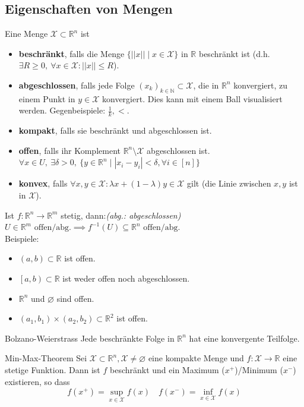 \documentclass[a4paper,10pt]{article}
\def\R{\mathbb{R}}
\def\N{\mathbb{N}}
\def\X{\mathcal{X}}
\begin{document}
\subsection{Eigenschaften von Mengen}
Eine Menge $\X \subset \R^n $ ist
\begin{itemize}
	\item \textbf{beschränkt}, falls die Menge $\{ ||x|| \mid x \in \X \}$ in $\R$ beschränkt ist (d.h. $\exists R \ge 0,\ \forall x \in \X: ||x|| \le R$).
	\item \textbf{abgeschlossen}, falls jede Folge $(x_k)_{k\in \N} \subset \X$, die in $\R^n$ konvergiert, zu einem Punkt in $y \in \X$ konvergiert. Dies kann mit einem Ball visualisiert werden. Gegenbeispiele: $\frac{1}{k}, <$.
	\item \textbf{kompakt}, falls sie beschränkt und abgeschlossen ist.
	\item \textbf{offen}, falls ihr Komplement $\R^n \setminus \X$ abgeschlossen ist. $\forall x \in U,\ \exists \delta>0,\ \{  y \in \mathbb{R}^{n} \mid |x_{i}-y_{i}| <\delta,\forall i\in [n] \}$
	\item \textbf{konvex}, falls $\forall x, y \in \X: \lambda x + (1 - \lambda)y \in \X$ gilt (die Linie zwischen $x, y$ ist in $\X$).
\end{itemize}
Ist $f: \mathbb{R}^{n}\to \mathbb{R}^{m}$ stetig, dann:\qquad  \textit{(abg.: abgeschlossen)}\\
$U \in \mathbb{R}^{m} \text{ offen/abg.}\implies f^{-1}(U) \subseteq \mathbb{R}^{n} \text{ offen/abg.}$ \\
Beispiele:
\begin{itemize}
	\item $(a,b) \subset \R$ ist offen.
	\item $\left[a,b\right) \subset \R$ ist weder offen noch abgeschlossen.
	\item $\R^n$ und $\varnothing$ sind offen.
	\item $(a_1, b_1) \times (a_2,b_2) \subset \R^2$ ist offen.
\end{itemize}
\begin{subbox}{Bolzano-Weierstrass}
    Jede beschränkte Folge in $\R^n$ hat eine konvergente Teilfolge.
\end{subbox}
\begin{subbox}{Min-Max-Theorem}
    Sei $\X \subset \R^n, \X \ne \varnothing$ eine kompakte Menge und $f: \X \to \R$ eine stetige Funktion. Dann ist $f$ beschränkt und ein Maximum ($x^+$)/Minimum ($x^-$) existieren, so dass
    $$f(x^+) = \sup_{x\in \X} f(x) \quad f(x^-) = \inf_{x \in \X} f(x)$$
\end{subbox}
\end{document}
